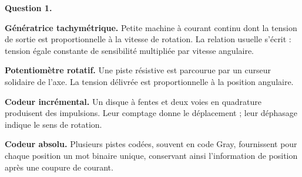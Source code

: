 \begin{corrigebox}
\textbf{Question 1.}

\textbf{Génératrice tachymétrique.} Petite machine à courant continu dont la tension de sortie est proportionnelle à la vitesse de rotation. La relation usuelle s'écrit : tension égale constante de sensibilité multipliée par vitesse angulaire.

\textbf{Potentiomètre rotatif.} Une piste résistive est parcourue par un curseur solidaire de l'axe. La tension délivrée est proportionnelle à la position angulaire.

\textbf{Codeur incrémental.} Un disque à fentes et deux voies en quadrature produisent des impulsions. Leur comptage donne le déplacement ; leur déphasage indique le sens de rotation.

\textbf{Codeur absolu.} Plusieurs pistes codées, souvent en code Gray, fournissent pour chaque position un mot binaire unique, conservant ainsi l'information de position après une coupure de courant.
\end{corrigebox}

